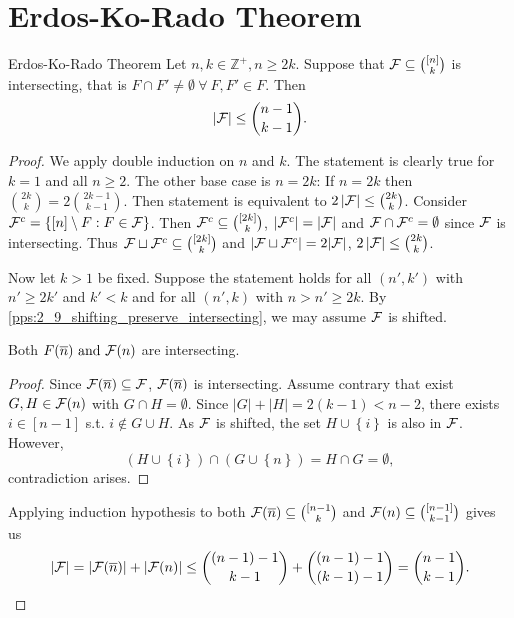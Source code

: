 \section{Erdos-Ko-Rado Theorem}

\begin{theorem}[thm:]{Erdos-Ko-Rado Theorem}
    Let $n,k\in \mathbb{Z}^+, n\geq 2k$. Suppose that $\mathcal{F}\subseteq {[n]\choose k}$ is intersecting, that is $F\cap F'\neq \emptyset \ \forall\ F,F'\in F$. Then
    \[\left|\mathcal{F}\right|\leq {n-1\choose k-1}.\]
\end{theorem}

\begin{proof}
    We apply double induction on $n$ and $k$. The statement is clearly true for $k=1$ and all $n\geq 2$. The other base case is $n=2k$: If $n=2k$ then ${2k\choose k}=2{2k-1\choose k-1}$. Then statement is equivalent to $2\left|\mathcal{F}\right|\leq {2k\choose k}$. Consider $\mathcal{F}^c=\left\{[n]\setminus F:F\in \mathcal{F}\right\}$. Then $\mathcal{F}^c\subseteq {[2k]\choose k}$, $\left|\mathcal{F}^c\right|=\left|\mathcal{F}\right|$ and $\mathcal{F}\cap \mathcal{F}^c=\emptyset $ since $\mathcal{F}$ is intersecting. Thus $\mathcal{F}\sqcup\mathcal{F}^c\subseteq {[2k]\choose k}$ and $\left|\mathcal{F}\sqcup\mathcal{F}^c\right|=2|\mathcal{F}|$, $2\left|\mathcal{F}\right|\leq {2k\choose k}$.

    Now let $k>1$ be fixed. Suppose the statement holds for all $(n',k')$ with $n'\geq 2k'$ and $k'<k$ and for all $(n',k)$ with $n>n'\geq 2k$. By \cref{pps:2_9_shifting_preserve_intersecting}, we may assume $\mathcal{F}$ is shifted.

    \begin{lemma}[lem:]{}
        Both $F(\overline{n})\textnormal{ and }\mathcal{F}(n)$ are intersecting.
        \tcblower
        \begin{proof}
            Since $\mathcal{F}(\overline{n})\subseteq \mathcal{F}$, $\mathcal{F}(\overline{n})$ is intersecting. Assume contrary that exist $G,H\in \mathcal{F}(n)$ with $G\cap H=\emptyset $. Since $\left|G\right|+\left|H\right|=2(k-1)<n-2$, there exists $i\in [n-1]$ s.t. $i\notin G\cup H$. As $\mathcal{F}$ is shifted, the set $H\cup \left\{i\right\}$ is also in $\mathcal{F}$. However,
            \[(H\cup \left\{i\right\})\cap (G\cup \left\{n\right\})=H\cap G=\emptyset ,\]
            contradiction arises.
        \end{proof}
    \end{lemma}
    Applying induction hypothesis to both $\mathcal{F}(\overline{n})\subseteq {[n-1\choose k}$ and $\mathcal{F}(n)\subseteq {[n-1]\choose k-1}$ gives us
    \[\left|\mathcal{F}\right|=\left|\mathcal{F}(\overline{n})\right|+\left|\mathcal{F}(n)\right|\leq {(n-1)-1\choose k-1}+{(n-1)-1\choose (k-1)-1}={n-1\choose k-1}.\]
\end{proof}
